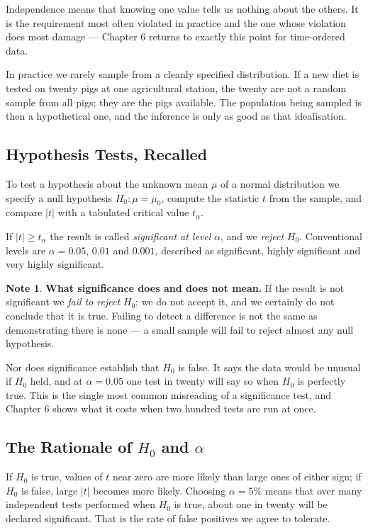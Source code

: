 \documentclass[11pt,a4paper]{article}
\theoremstyle{definition}
\newtheorem{note}[thm]{Note}
\begin{document}
Independence means that knowing one value tells us nothing about the others. It is
the requirement most often violated in practice and the one whose violation does
most damage --- Chapter 6 returns to exactly this point for time-ordered data.

In practice we rarely sample from a cleanly specified distribution. If a new diet
is tested on twenty pigs at one agricultural station, the twenty are not a random
sample from all pigs; they are the pigs available. The population being sampled is
then a hypothetical one, and the inference is only as good as that idealisation.

\subsection{Hypothesis Tests, Recalled}

To test a hypothesis about the unknown mean $\mu$ of a normal distribution we
specify a null hypothesis $H_0 : \mu = \mu_0$, compute the statistic $t$ from the
sample, and compare $\left|t\right|$ with a tabulated critical value
$t_{\alpha}$.

If $\left|t\right| \geq t_{\alpha}$ the result is called \emph{significant at
level} $\alpha$, and we \emph{reject} $H_0$. Conventional levels are
$\alpha = 0.05$, $0.01$ and $0.001$, described as significant, highly significant
and very highly significant.

\begin{note}
\textbf{What significance does and does not mean.} If the result is not
significant we \emph{fail to reject} $H_0$; we do not accept it, and we certainly
do not conclude that it is true. Failing to detect a difference is not the same as
demonstrating there is none --- a small sample will fail to reject almost any null
hypothesis.

Nor does significance establish that $H_0$ is false. It says the data would be
unusual if $H_0$ held, and at $\alpha = 0.05$ one test in twenty will say so when
$H_0$ is perfectly true. This is the single most common misreading of a
significance test, and Chapter 6 shows what it costs when two hundred tests are
run at once.
\end{note}

\subsection{The Rationale of $H_0$ and $\alpha$}

If $H_0$ is true, values of $t$ near zero are more likely than large ones of either
sign; if $H_0$ is false, large $\left|t\right|$ becomes more likely. Choosing
$\alpha = 5\%$ means that over many independent tests performed when $H_0$ is true,
about one in twenty will be declared significant. That is the rate of false
positives we agree to tolerate.
\end{document}
